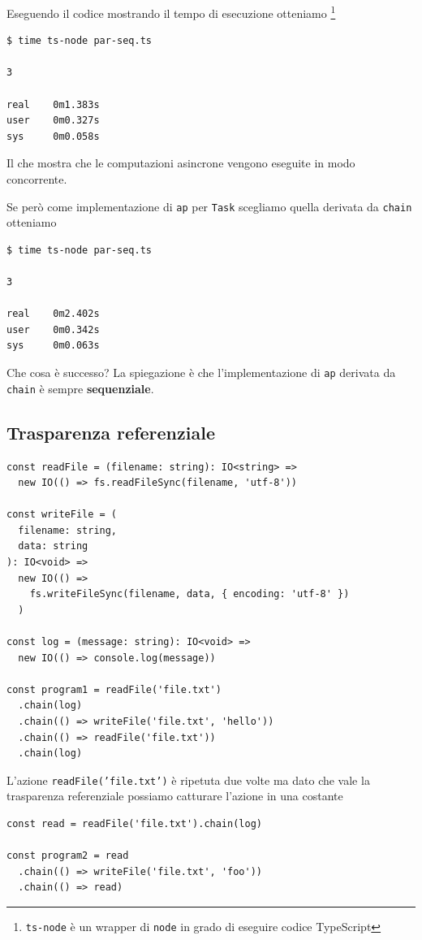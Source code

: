 \documentclass[12pt]{article}
\begin{document}
Eseguendo il codice mostrando il tempo di esecuzione otteniamo
\footnote{\texttt{ts-node} è un wrapper di \texttt{node} in grado di eseguire codice TypeScript}

\begin{verbatim}
$ time ts-node par-seq.ts

3

real    0m1.383s
user    0m0.327s
sys     0m0.058s
\end{verbatim}

Il che mostra che le computazioni asincrone vengono eseguite in modo concorrente.

Se però come implementazione di \texttt{ap} per \texttt{Task} scegliamo quella derivata da \texttt{chain} otteniamo

\begin{verbatim}
$ time ts-node par-seq.ts

3

real    0m2.402s
user    0m0.342s
sys     0m0.063s
\end{verbatim}

Che cosa è successo? La spiegazione è che l'implementazione di \texttt{ap} derivata da \texttt{chain} è sempre \textbf{sequenziale}.

\subsection{Trasparenza referenziale}

\begin{verbatim}
const readFile = (filename: string): IO<string> =>
  new IO(() => fs.readFileSync(filename, 'utf-8'))

const writeFile = (
  filename: string,
  data: string
): IO<void> =>
  new IO(() =>
    fs.writeFileSync(filename, data, { encoding: 'utf-8' })
  )

const log = (message: string): IO<void> =>
  new IO(() => console.log(message))

const program1 = readFile('file.txt')
  .chain(log)
  .chain(() => writeFile('file.txt', 'hello'))
  .chain(() => readFile('file.txt'))
  .chain(log)
\end{verbatim}

L'azione \texttt{readFile('file.txt')} è ripetuta due volte ma dato che vale la trasparenza referenziale possiamo catturare l'azione in una costante

\begin{verbatim}
const read = readFile('file.txt').chain(log)

const program2 = read
  .chain(() => writeFile('file.txt', 'foo'))
  .chain(() => read)
\end{verbatim}
\end{document}
